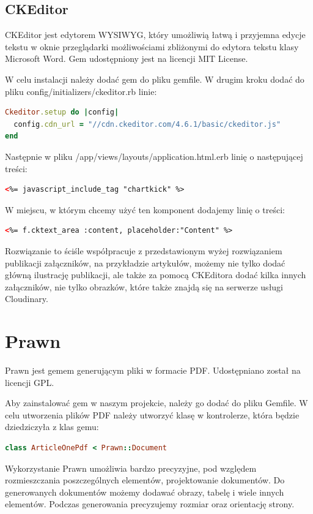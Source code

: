 \documentclass[openright]{xmgr}
\begin{document}
\subsection{CKEditor}
CKEditor jest edytorem WYSIWYG, który umożliwią łatwą i przyjemna edycje tekstu w oknie przeglądarki możliwościami zbliżonymi do edytora tekstu klasy Microsoft Word. Gem udostępniony jest na licencji MIT License. 

W celu instalacji należy dodać gem do pliku gemfile. W drugim kroku dodać do pliku config/initializers/ckeditor.rb linie: 
\begin{lstlisting}[language=ruby]
Ckeditor.setup do |config|
  config.cdn_url = "//cdn.ckeditor.com/4.6.1/basic/ckeditor.js"
end
\end{lstlisting}
Następnie w pliku /app/views/layouts/application.html.erb linię o następującej treści:
\begin{lstlisting}[language=html]
<%= javascript_include_tag "chartkick" %>
\end{lstlisting}
W miejscu, w którym chcemy użyć ten komponent dodajemy linię o treści:
\begin{lstlisting}[language=html]
<%= f.cktext_area :content, placeholder:"Content" %>
\end{lstlisting}
Rozwiązanie to ściśle współpracuje z przedstawionym wyżej rozwiązaniem publikacji załączników, na przykładzie artykułów, możemy nie tylko dodać główną ilustrację publikacji, ale także za pomocą CKEditora dodać kilka innych załączników, nie tylko obrazków, które także znajdą się na serwerze usługi Cloudinary. 

\section{Prawn}
Prawn jest gemem generującym pliki w formacie PDF. Udostępniano został na licencji GPL.

Aby zainstalować gem w naszym projekcie, należy go dodać do pliku Gemfile. W celu utworzenia plików PDF należy utworzyć klasę w kontrolerze, która będzie dziedziczyła z klas gemu:
\begin{lstlisting}[language=ruby]
class ArticleOnePdf < Prawn::Document
\end{lstlisting}
Wykorzystanie Prawn umożliwia bardzo precyzyjne, pod względem rozmieszczania poszczególnych elementów, projektowanie dokumentów. Do generowanych dokumentów możemy dodawać obrazy, tabelę  i wiele innych elementów. Podczas generowania precyzujemy rozmiar oraz orientację strony. 
\end{document}
